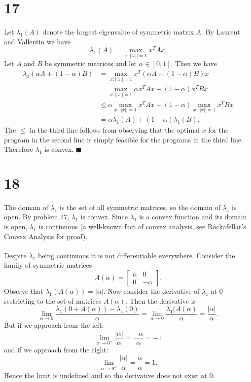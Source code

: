 \documentclass[letterpaper,12pt,oneside,onecolumn]{article}
\newcommand{\1}{\mathbbm{1}}
\begin{document}
\section*{17}
\paragraph{}
Let $\lambda_1(A)$ denote the largest eigenvalue of symmetric matrix $A$. By Laurent and Vallentin we have
$$\lambda_1(A) = \max_{x: ||x|| = 1} x^TAx.$$
Let $A$ and $B$ be symmetric matrices  and let $\alpha \in [0,1]$.
Then we have
\begin{align*}
\lambda_1(\alpha A + (1-\alpha)B) &= \max_{x: ||x|| =1} x^T(\alpha A + (1-\alpha)B)x \\
&= \max_{x: ||x|| =1}\alpha x^TAx + (1-\alpha)x^TBx \\
&\leq \alpha\max_{x:||x|| =1}x^TAx + (1-\alpha)\max_{x:||x||=1} x^TBx\\
&= \alpha\lambda_1(A) + (1-\alpha)\lambda_1(B).
\end{align*}
The $\leq$ in the third line follows from observing that the optimal $x$ for the program in the second line is simply feasible for the programs in the third line. Therefore $\lambda_1$ is convex. $\blacksquare$
\section*{18}
\paragraph{}
The domain of $\lambda_1$ is the set of all symmetric matrices, so the domain of $\lambda_1$ is open. By problem $17$, $\lambda_1$ is convex. Since $\lambda_1$ is a convex function and its domain is open, $\lambda_1$ is continuous (a well-known fact of convex analysis, see Rockafellar's Convex Analysis for proof).
\paragraph{}
Despite $\lambda_1$ being continuous it is not differentiable everywhere. Consider the family of symmetric matrices
$$A(\alpha) = \begin{bmatrix} \alpha & 0 \\ 0 & -\alpha \end{bmatrix}.$$
Observe that $\lambda_1(A(\alpha)) = |\alpha|$. Now consider the derivative of $\lambda_1$ at $0$ restricting to the set of matrices $A(\alpha)$. Then the derivative is
$$\lim_{\alpha\rightarrow 0} \frac{\lambda_1(0 + A(\alpha)) - \lambda_1(0)}{\alpha} = \lim_{\alpha\rightarrow 0}\frac{\lambda_1(A(\alpha)}{\alpha} = \frac{|\alpha|}{\alpha}.$$
But if we approach from the left:
$$\lim_{\alpha\rightarrow 0^-} \frac{|\alpha|}{\alpha} = \frac{-\alpha}{\alpha} = -1$$
and if we approach from the right:
$$\lim_{\alpha \rightarrow 0^+}\frac{|\alpha|}{\alpha} = \frac{\alpha}{\alpha} = 1.$$
Hence the limit is undefined and so the derivative does not exist at $0$. 
\end{document}
